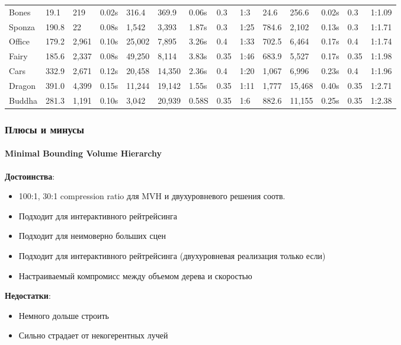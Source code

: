 \documentclass{beamer}
\begin{document}
\begin{frame}[t]
{\begin{tabular}{l||l l l||l l l l l||l l l l l}
            \hline
            Bones & 19.1 & 219 & 0.02s & 316.4 & 369.9 & 0.06s & 0.3 & 1:3 & 24.6 & 256.6 & 0.02s & 0.3 & 1:1.09 \\
            Sponza & 190.8 & 22 & 0.08s & 1,542 & 3,393 & 1.87s & 0.3 & 1:25 & 784.6 & 2,102 & 0.13s & 0.3 & 1:1.71 \\
            Office & 179.2 & 2,961 & 0.10s & 25,002 & 7,895 & 3.26s & 0.4 & 1:33 & 702.5 & 6,464 & 0.17s & 0.4 & 1:1.74 \\
            Fairy & 185.6 & 2,337 & 0.08s & 49,250 & 8,114 & 3.83s & 0.35 & 1:46 & 683.9 & 5,527 & 0.17s & 0.35 & 1:1.98 \\
            Cars & 332.9 & 2,671 & 0.12s & 20,458 & 14,350 & 2.36s & 0.4 & 1:20 & 1,067 & 6,996 & 0.23s & 0.4 & 1:1.96 \\
            Dragon & 391.0 & 4,399 & 0.15s & 11,244 & 19,142 & 1.55s & 0.35 & 1:11 & 1,777 & 15,468 & 0.40s & 0.35 & 1:2.71 \\
            Buddha & 281.3 & 1,191 & 0.10s & 3,042 & 20,939 & 0.58S & 0.35 & 1:6 & 882.6 & 11,155 & 0.25s & 0.35 & 1:2.38 \\
            \hline
    \end{tabular} }
\end{frame}

\begin{frame}[t]
    \frametitle{Плюсы и минусы}
    \framesubtitle{Minimal Bounding Volume Hierarchy}

    \textbf{Достоинства}:
    \begin{itemize}
        \item
            100:1, 30:1 compression ratio для MVH и двухуровневого решения соотв.
        \item
            Подходит для интерактивного рейтрейсинга
        \item
            Подходит для неимоверно больших сцен
        \item
            Подходит для интерактивного рейтрейсинга (двухуровневая реализация только если)
        \item
            Настраиваемый компромисс между объемом дерева и скоростью
    \end{itemize}

    \textbf{Недостатки}:
    \begin{itemize}
        \item
            Немного дольше строить
        \item
            Сильно страдает от некогерентных лучей
    \end{itemize}

\end{frame}
\end{document}
